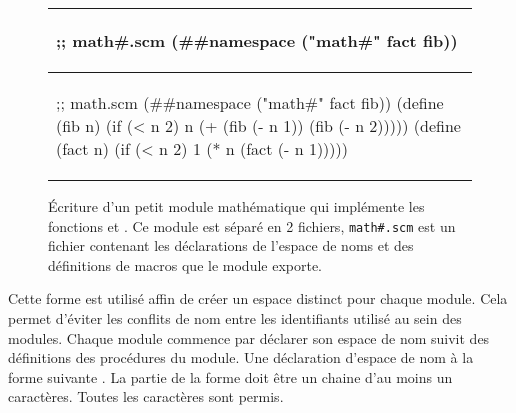 \begin{center}
  \begin{figure}[h]
  \begin{tabular}{|l|}
\hline
\begin{mplisting}{0.5}
;; math#.scm
(##namespace ("math#" fact fib))
\end{mplisting} \\\hline
\begin{mplisting}{0.6}
;; math.scm
(##namespace ("math#" fact fib))
(define (fib n)
  (if (< n 2)
    n
    (+ (fib (- n 1)) (fib (- n 2)))))
(define (fact n)
  (if (< n 2)
    1
    (* n (fact (- n 1)))))
\end{mplisting}\\\hline
  \end{tabular}
  \caption{Écriture d'un petit module mathématique qui implémente les fonctions 
    et . Ce module est séparé en 2 fichiers, \texttt{math\#.scm} est un fichier
    contenant les déclarations de l'espace de noms et des définitions de macros que le module
    exporte.}
  \label{fig:math_module1}
\end{figure}
\end{center}

%


Cette forme est utilisé affin de créer un espace distinct pour chaque module.
Cela permet d'éviter les conflits de nom entre les identifiants utilisé au sein
des modules.  Chaque module commence par déclarer son espace de nom suivit des
définitions des procédures du module.  Une déclaration d'espace de nom à la
forme suivante . La partie 
de la forme  doit être un chaine d'au moins un caractères.
Toutes les caractères sont permis.

